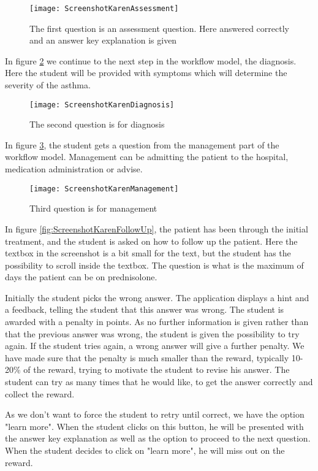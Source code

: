 \begin{figure}[h!]
	\texttt{[image: ScreenshotKarenAssessment]}
	\caption {The first question is an assessment question. Here answered correctly and an answer key explanation is given}
	\label{fig:ScreenshotKarenAssessment}
\end{figure}

In figure \ref{fig:ScreenshotKarenDiagnosis} we continue to the next step in the workflow model, the diagnosis. Here the student will be provided with symptoms which will determine the severity of the asthma.

\begin{figure}[h!]
	\texttt{[image: ScreenshotKarenDiagnosis]}
		\caption {The second question is for diagnosis}
		\label{fig:ScreenshotKarenDiagnosis}
\end{figure}

In figure \ref{fig:ScreenshotKarenManagement}, the student gets a question from the management part of the workflow model. Management can be admitting the patient to the hospital, medication administration or advise.
\begin{figure}[h!]
	\texttt{[image: ScreenshotKarenManagement]}
	\caption {Third question is for management}
	\label{fig:ScreenshotKarenManagement}
\end{figure}

In figure \ref{fig:ScreenshotKarenFollowUp}, the patient has been through the initial treatment, and the student is asked on how to follow up the patient. Here the textbox in the screenshot is a bit small for the text, but the student has the possibility to scroll inside the textbox. The question is what is the maximum of days the patient can be on prednisolone.

Initially the student picks the wrong answer. The application displays a hint and a feedback, telling the student that this answer was wrong. The student is awarded with a penalty in points. As no further information is given rather than that the previous answer was wrong, the student is given the possibility to try again. If the student tries again, a wrong answer will give a further penalty. We have made sure that the penalty is much smaller than the reward, typically 10-20\% of the reward, trying to motivate the student to revise his answer. The student can try as many times that he would like, to get the answer correctly and collect the reward.

As we don't want to force the student to retry until correct, we have the option "learn more". When the student clicks on this button, he will be presented with the answer key explanation as well as the option to proceed to the next question. When the student decides to click on "learn more", he will miss out on the reward.

